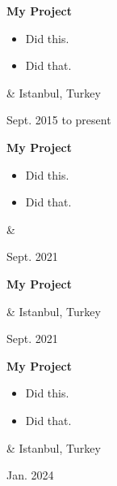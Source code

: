 \documentclass[10pt, letterpaper]{article}
\newenvironment{highlights}{
        \begin{itemize}[
                topsep=0pt,
                parsep=0.10 cm,
                partopsep=0pt,
                itemsep=0pt,
                after=\vspace{-1\baselineskip},
                leftmargin=0.4 cm + 3pt
            ]
    }{
        \end{itemize}
    } %
\let\originalTabularx\tabularx
\let\originalEndTabularx\endtabularx
\renewenvironment{tabularx}{\bgroup\centering\originalTabularx}{\originalEndTabularx\par\egroup}
\begin{document}
        \vspace{0.2 cm}
        \begin{tabularx}{
            \textwidth-0.4 cm-0.13cm
        }{
            K{0.2 cm}
            R{4.1 cm}
        }
            \textbf{My Project}

            \vspace{0.10 cm}

            \begin{highlights}
                \item Did this.
                \item Did that.
            \end{highlights}
            &
            Istanbul, Turkey

            Sept. 2015 to present
        \end{tabularx}


        \vspace{0.2 cm}
        \begin{tabularx}{
            \textwidth-0.4 cm-0.13cm
        }{
            K{0.2 cm}
            R{4.1 cm}
        }
            \textbf{My Project}

            \vspace{0.10 cm}

            \begin{highlights}
                \item Did this.
                \item Did that.
            \end{highlights}
            &
            

            Sept. 2021
        \end{tabularx}


        \vspace{0.2 cm}
        \begin{tabularx}{
            \textwidth-0.4 cm-0.13cm
        }{
            K{0.2 cm}
            R{4.1 cm}
        }
            \textbf{My Project}

            \vspace{0.10 cm}

            &
            Istanbul, Turkey

            Sept. 2021
        \end{tabularx}


        \vspace{0.2 cm}
        \begin{tabularx}{
            \textwidth-0.4 cm-0.13cm
        }{
            K{0.2 cm}
            R{4.1 cm}
        }
            \textbf{My Project}

            \vspace{0.10 cm}

            \begin{highlights}
                \item Did this.
                \item Did that.
            \end{highlights}
            &
            Istanbul, Turkey

            Jan. 2024
        \end{tabularx}
\end{document}
